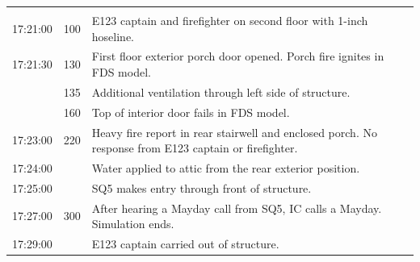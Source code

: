 \documentclass[12pt,oneside]{book}
\begin{document}
\begin{table}
\begin{tabular}{ccl}
          & & \\[.25cm] 
\multirow{2}{*}{17:21:00} & \multirow{2}{*}{100} & \multirow{2}{*}{\parbox{8cm}{E123 captain and firefighter on second floor with 1-inch hoseline.}} \\
         &  & \\[.25cm]
\multirow{2}{*}{17:21:30} & \multirow{2}{*}{130} &  \multirow{2}{*}{\parbox{8cm}{First floor exterior porch door opened. Porch fire ignites in FDS model.}} \\
        &  & \\[.25cm]
        & 135 & Additional ventilation through left side of structure. \\[.25cm] 
        & 160 & Top of interior door fails in FDS model. \\[.25cm] 
\multirow{3}{*}{17:23:00}    & \multirow{3}{*}{220} & \multirow{3}{*}{\parbox{8cm} {Heavy fire report in rear stairwell and enclosed porch. No response from E123 captain or firefighter.}} \\
         & & \\[.25cm]
         & & \\[.25cm]  
17:24:00    &   & Water applied to attic from the rear exterior position. \\[.25cm]
17:25:00    &   & SQ5 makes entry through front of structure. \\[.25cm]
\multirow{2}{*}{17:27:00}    & \multirow{2}{*}{300}  & \multirow{2}{*}{\parbox{8cm} {After hearing a Mayday call from SQ5, IC calls a Mayday. Simulation ends.}}\\
         & &  \\[.25cm]
17:29:00    &   & E123 captain carried out of structure. \\
\bottomrule[1.25pt]
\end{tabular}\par
\end{table}
\end{document}
